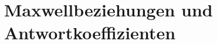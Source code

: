 
\chapter{Maxwellbeziehungen und Antwortkoeffizienten\label{sec:Maxwellbeziehungen und Antwortkoeffizienten}}

